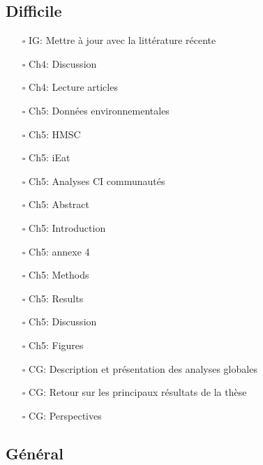 \hypertarget{difficile}{%
\subsection*{Difficile}\label{difficile}}

\begin{itemize}
\tightlist
\item[$\square$]
  IG: Mettre à jour avec la littérature récente
\item[$\square$]
  Ch4: Discussion
\item[$\square$]
  Ch4: Lecture articles
\item[$\square$]
  Ch5: Données environnementales
\item[$\square$]
  Ch5: HMSC
\item[$\square$]
  Ch5: iEat
\item[$\square$]
  Ch5: Analyses CI communautés
\item[$\square$]
  Ch5: Abstract
\item[$\square$]
  Ch5: Introduction
\item[$\square$]
  Ch5: annexe 4
\item[$\square$]
  Ch5: Methods
\item[$\square$]
  Ch5: Results
\item[$\square$]
  Ch5: Discussion
\item[$\square$]
  Ch5: Figures
\item[$\square$]
  CG: Description et présentation des analyses globales
\item[$\square$]
  CG: Retour sur les principaux résultats de la thèse
\item[$\square$]
  CG: Perspectives
\end{itemize}

\hypertarget{guxe9nuxe9ral}{%
\subsection*{Général}\label{guxe9nuxe9ral}}


